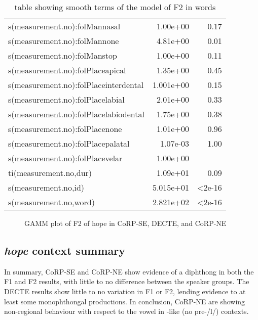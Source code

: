 \documentclass[../../../00.FullDoc/tex/Thesis]{subfiles}
\begin{document}
\begin{table}[hbtp]
\begin{tabular}{lrr}
		s(measurement.no):folMannasal & 1.00e+00 & 0.17 \\
		s(measurement.no):folMannone & 4.81e+00 & 0.01 \\
		s(measurement.no):folManstop & 1.00e+00 & 0.11 \\
		s(measurement.no):folPlaceapical & 1.35e+00 & 0.45 \\
		s(measurement.no):folPlaceinterdental & 1.001e+00 & 0.15 \\
		s(measurement.no):folPlacelabial & 2.01e+00 & 0.33 \\
		s(measurement.no):folPlacelabiodental & 1.75e+00 & 0.38 \\
		s(measurement.no):folPlacenone & 1.01e+00 & 0.96 \\
		s(measurement.no):folPlacepalatal & 1.07e-03 & 1.00 \\
		s(measurement.no):folPlacevelar & 1.00e+00 & \\
		ti(measurement.no,dur) & 1.09e+01 & 0.09 \\
		s(measurement.no,id) & 5.015e+01 & <2e-16 \\
		s(measurement.no,word) & 2.821e+02 & <2e-16 \\
		\hline
	\end{tabular}
	\caption{table showing smooth terms of the model of F2 in \hope{} words}
	\label{tbl:hopeF2-smooth}
\end{table}

\begin{figure}[h]
	
	\caption{GAMM plot of F2 of hope in CoRP-SE, DECTE, and CoRP-NE} \label{fig:hopeF2}
\end{figure}

\subsection{\textit{hope} context summary}
In summary, CoRP-SE and CoRP-NE show evidence of a diphthong in both the F1 and F2 results, with little to no difference between the speaker groups. The DECTE results show little to no variation in F1 or F2, lending evidence to at least some monophthongal productions. In conclusion, CoRP-NE are showing non-regional behaviour with respect to the \goat{} vowel in \hope{}-like (no pre-/l/) contexts.
\end{document}
